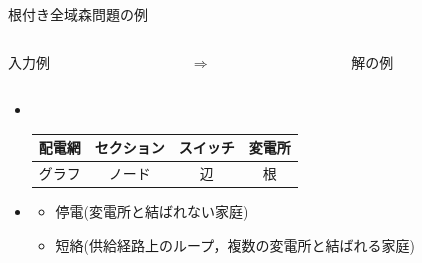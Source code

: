 \begin{frame}{根付き全域森問題の例}
  \begin{columns}
    \begin{column}{0.45\textwidth}\centering
      \begin{exampleblock}{入力例}
	\centering
	
      \end{exampleblock}
    \end{column}
    \begin{column}{0.05\textwidth}\centering
      $\Rightarrow$
    \end{column}
    \begin{column}{0.45\textwidth}\centering
      \begin{exampleblock}{解の例}
        \centering
        
      \end{exampleblock}
    \end{column}
  \end{columns}
  \vfill
  \begin{itemize}
  \item {} \\
	 \begin{center}
      \begin{minipage}[c]{0.7\textwidth}
	   \begin{block}{}
		\centering
		\begin{tabular}{c|ccc}
		配電網 & セクション & スイッチ & 変電所 \\
		\hline
		グラフ & ノード & 辺 & 根
		\end{tabular}
	   \end{block}
      \end{minipage}
	 \end{center}\vfill
   \item {}
		 \begin{itemize}
		  \item 停電(変電所と結ばれない家庭)
		  \item 短絡(供給経路上のループ，複数の変電所と結ばれる家庭)
		 \end{itemize}
  \end{itemize}
\end{frame}

